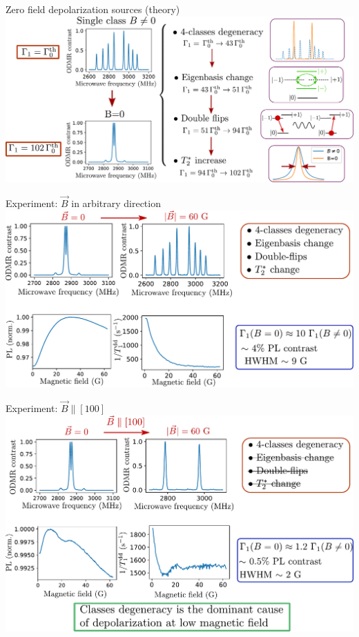 \documentclass{beamer}
\begin{document}
\begin{frame}{Zero field depolarization sources (theory)}
\centering
\includegraphics[width=\textwidth,height=0.9\textheight,keepaspectratio]{Slide_0B_theorie}
\end{frame}

\begin{frame}{Experiment: $\vec B$ in arbitrary direction}
\centering
\includegraphics[width=\textwidth,height=0.9\textheight,keepaspectratio]{Slide_T1_PL_1x1x1x1}
\end{frame}

\begin{frame}{Experiment: $\vec B \parallel [100]$}
\centering
\includegraphics[width=\textwidth,height=0.9\textheight,keepaspectratio]{Slide_T1_PL_100}
\end{frame}
\end{document}
